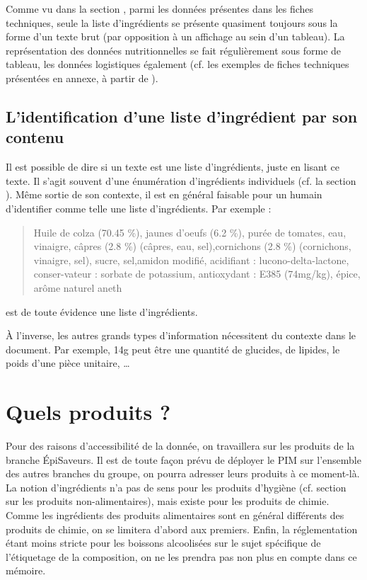             Comme vu dans la section , parmi les données présentes dans les fiches techniques, seule la liste d'ingrédients se présente quasiment toujours sous la forme d'un texte brut (par opposition à un affichage au sein d'un tableau).
            La représentation des données nutritionnelles se fait régulièrement sous forme de tableau, les données logistiques également (cf. les exemples de fiches techniques présentées en annexe, à partir de ).
        
            \subsection{L'identification d'une liste d'ingrédient par son contenu}

            Il est possible de dire si un texte est une liste d'ingrédients, juste en lisant ce texte.
            Il s'agit souvent d'une énumération d'ingrédients individuels (cf. la section ).
            Même sortie de son contexte, il est en général faisable pour un humain d'identifier comme telle une liste d'ingrédients.
            Par exemple : 
            \begin{quotation}
                Huile de colza (70.45 \%), jaunes d’oeufs (6.2 \%), purée de tomates, eau, vinaigre, câpres (2.8 \%) (câpres, eau, sel),cornichons (2.8 \%) (cornichons, vinaigre, sel), sucre, sel,amidon modifié, acidifiant : lucono-delta-lactone, conser-vateur : sorbate de potassium, antioxydant : E385 (74mg/kg), épice, arôme naturel aneth
            \end{quotation}
            est de toute évidence une liste d'ingrédients.

            \`{A} l'inverse, les autres grands types d'information nécessitent du contexte dans le document.
            Par exemple, \og 14g \fg peut être une quantité de glucides, de lipides, le poids d'une pièce unitaire, \dots
            

        \section{Quels produits ?}
        
        Pour des raisons d'accessibilité de la donnée, on travaillera sur les produits de la branche \'{E}piSaveurs. 
        Il est de toute façon prévu de déployer le PIM sur l'ensemble des autres branches du groupe, on pourra adresser leurs produits à ce moment-là.
        La notion d'ingrédients n'a pas de sens pour les produits d'hygiène (cf. section  sur les produits non-alimentaires), mais existe pour les produits de chimie.
        Comme les ingrédients des produits alimentaires sont en général différents des produits de chimie, on se limitera d'abord aux premiers.
        Enfin, la réglementation étant moins stricte pour les boissons alcoolisées sur le sujet spécifique de l'étiquetage de la composition, on ne les prendra pas non plus en compte dans ce mémoire.

